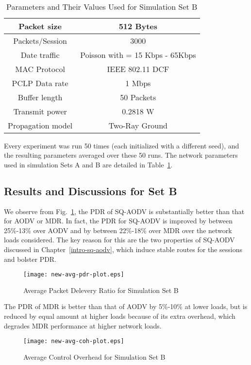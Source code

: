 \begin{table}[htbp]
 \centering
  \caption{Parameters and Their Values Used for Simulation Set B} 
  \hfill \\
  \begin{tabular}{|c|c|}
  \hline
  Packet size & 512 Bytes\\
  \hline
  Packets/Session & 3000 \\
  \hline
  Date traffic & Poisson with  = 15 Kbps - 65Kbps\\
  \hline
  MAC Protocol & IEEE 802.11 DCF\\
  \hline
  PCLP Data rate & 1 Mbps \\
  \hline
  Buffer length & 50 Packets \\
  \hline
  Transmit power & 0.2818 W\\
  \hline
  Propagation model & Two-Ray Ground\\
  \hline
  \end{tabular}
  \label{tab57}
\end{table}

Every experiment was run 50 times (each initialized with a different seed), and the resulting parameters averaged over these 50 runs. The network parameters used in simulation Sets A and B are detailed in Table~\ref{tab57}.

\subsection{Results and Discussions for Set B}
\label{results-setb}
We observe from Fig.~\ref{fig516}, the PDR of SQ-AODV is substantially better than that for AODV or MDR. In fact, the PDR for SQ-AODV is improved by between 25\%-13\% over AODV and by between 22\%-18\% over MDR over the network loads considered. The key reason for this are  the two properties of SQ-AODV discussed in Chapter~\ref{intro-sq-aodv}, which induce stable routes for the sessions and bolster PDR.

\begin{figure}[htbp]
	\centering
	\texttt{[image: new-avg-pdr-plot.eps]}
	\caption{Average Packet Delevery Ratio for Simulation Set B}
	\label{fig516}
\end{figure}

The PDR of MDR is better than that of AODV by 5\%-10\% at lower loads, but is reduced by equal amount 
at higher loads because of its extra overhead, which degrades MDR performance at higher network loads.

\begin{figure}[htbp]
	\centering
	\texttt{[image: new-avg-coh-plot.eps]}
	\caption{Average Control Overhead for Simulation Set B}
	\label{fig517}
\end{figure}

